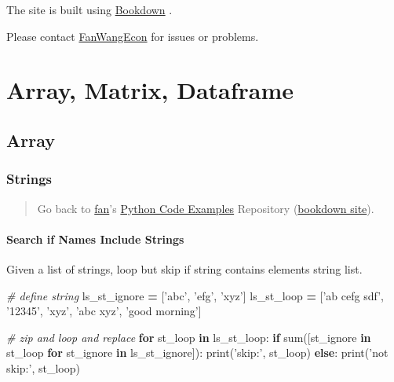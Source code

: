 \documentclass[
]{book}
\newenvironment{Shaded}{\begin{snugshade}}{\end{snugshade}}
\newcommand{\BuiltInTok}[1]{#1}
\newcommand{\CommentTok}[1]{\textcolor[rgb]{0.56,0.35,0.01}{\textit{#1}}}
\newcommand{\ControlFlowTok}[1]{\textcolor[rgb]{0.13,0.29,0.53}{\textbf{#1}}}
\newcommand{\KeywordTok}[1]{\textcolor[rgb]{0.13,0.29,0.53}{\textbf{#1}}}
\newcommand{\NormalTok}[1]{#1}
\newcommand{\OperatorTok}[1]{\textcolor[rgb]{0.81,0.36,0.00}{\textbf{#1}}}
\newcommand{\StringTok}[1]{\textcolor[rgb]{0.31,0.60,0.02}{#1}}
\begin{document}
The site is built using \href{https://bookdown.org/}{Bookdown} \citep{R-bookdown}.

Please contact \href{https://fanwangecon.github.io/}{FanWangEcon} for issues or problems.

\hypertarget{array-matrix-dataframe}{%
\chapter{Array, Matrix, Dataframe}\label{array-matrix-dataframe}}

\hypertarget{array}{%
\section{Array}\label{array}}

\hypertarget{strings}{%
\subsection{Strings}\label{strings}}

\begin{quote}
Go back to \href{http://fanwangecon.github.io/}{fan}'s \href{https://fanwangecon.github.io/pyfan/}{Python Code Examples} Repository (\href{https://fanwangecon.github.io/pyfan/bookdown}{bookdown site}).
\end{quote}

\hypertarget{search-if-names-include-strings}{%
\subsubsection{Search if Names Include Strings}\label{search-if-names-include-strings}}

Given a list of strings, loop but skip if string contains elements string list.

\begin{Shaded}
\begin{Highlighting}[]
\CommentTok{# define string}
\NormalTok{ls_st_ignore }\OperatorTok{=}\NormalTok{ [}\StringTok{'abc'}\NormalTok{, }\StringTok{'efg'}\NormalTok{, }\StringTok{'xyz'}\NormalTok{]}
\NormalTok{ls_st_loop }\OperatorTok{=}\NormalTok{ [}\StringTok{'ab cefg sdf'}\NormalTok{, }\StringTok{'12345'}\NormalTok{, }\StringTok{'xyz'}\NormalTok{, }\StringTok{'abc xyz'}\NormalTok{, }\StringTok{'good morning'}\NormalTok{]}

\CommentTok{# zip and loop and replace}
\ControlFlowTok{for}\NormalTok{ st_loop }\KeywordTok{in}\NormalTok{ ls_st_loop:}
  \ControlFlowTok{if} \BuiltInTok{sum}\NormalTok{([st_ignore }\KeywordTok{in}\NormalTok{ st_loop }\ControlFlowTok{for}\NormalTok{ st_ignore }\KeywordTok{in}\NormalTok{ ls_st_ignore]):}
    \BuiltInTok{print}\NormalTok{(}\StringTok{'skip:'}\NormalTok{, st_loop)}
  \ControlFlowTok{else}\NormalTok{:}
    \BuiltInTok{print}\NormalTok{(}\StringTok{'not skip:'}\NormalTok{, st_loop)}
\end{Highlighting}
\end{Shaded}
\end{document}
